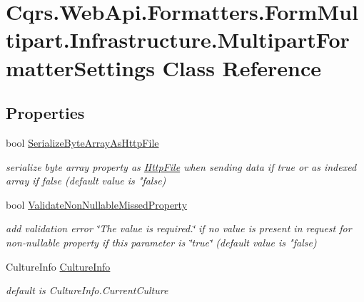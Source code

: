 \hypertarget{classCqrs_1_1WebApi_1_1Formatters_1_1FormMultipart_1_1Infrastructure_1_1MultipartFormatterSettings}{}\section{Cqrs.\+Web\+Api.\+Formatters.\+Form\+Multipart.\+Infrastructure.\+Multipart\+Formatter\+Settings Class Reference}
\label{classCqrs_1_1WebApi_1_1Formatters_1_1FormMultipart_1_1Infrastructure_1_1MultipartFormatterSettings}
\subsection*{Properties}
\begin{DoxyCompactItemize}
\item 
bool \hyperlink{classCqrs_1_1WebApi_1_1Formatters_1_1FormMultipart_1_1Infrastructure_1_1MultipartFormatterSettings_ada06553a43f83734ecef9d811993d048}{Serialize\+Byte\+Array\+As\+Http\+File}
\begin{DoxyCompactList}\small\item\em serialize byte array property as \hyperlink{classCqrs_1_1WebApi_1_1Formatters_1_1FormMultipart_1_1Infrastructure_1_1HttpFile}{Http\+File} when sending data if true or as indexed array if false (default value is "false) \end{DoxyCompactList}\item 
bool \hyperlink{classCqrs_1_1WebApi_1_1Formatters_1_1FormMultipart_1_1Infrastructure_1_1MultipartFormatterSettings_a8db49349b200f3aea3fc9642ca1f9fd9}{Validate\+Non\+Nullable\+Missed\+Property}
\begin{DoxyCompactList}\small\item\em add validation error \char`\"{}\+The value is required.\char`\"{} if no value is present in request for non-\/nullable property if this parameter is \char`\"{}true\char`\"{} (default value is "false) \end{DoxyCompactList}\item 
Culture\+Info \hyperlink{classCqrs_1_1WebApi_1_1Formatters_1_1FormMultipart_1_1Infrastructure_1_1MultipartFormatterSettings_a3ee49282a37f9e6f39e5e0e8558e4e5e}{Culture\+Info}
\begin{DoxyCompactList}\small\item\em default is Culture\+Info.\+Current\+Culture \end{DoxyCompactList}\end{DoxyCompactItemize}


